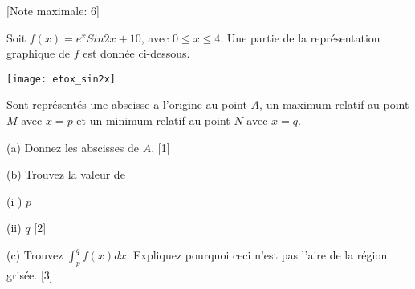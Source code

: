 \begin{question}
  \hspace*{\fill} [Note maximale: 6]\par
  \noindent Soit $f(x) = e^x Sin 2x + 10$, avec $0 \le x \le  4$.  Une partie de la représentation graphique de $f$ est donnée ci-dessous.\par
  \medskip
  \begin{center}
    \texttt{[image: etox\_sin2x]}\par
  \end{center}
  \noindent Sont représentés une abscisse a l'origine au point $A$, un maximum relatif au point $M$ avec $x = p$ et un minimum relatif au point $N$ avec $x = q$.\par
  \medskip
  (a) Donnez les abscisses de $A$.\hspace*{\fill} [1]\par
  \medskip
  (b) Trouvez la valeur de\par
  \hspace{1em} (i ) $p$\par 
  \hspace{1em} (ii) $q$\hspace*{\fill} [2]\par
  \medskip
  (c) Trouvez $\int_p^qf(x)dx$. Expliquez pourquoi ceci n'est pas l'aire de la région grisée.\hspace*{\fill} [3]\par
\end{question}
